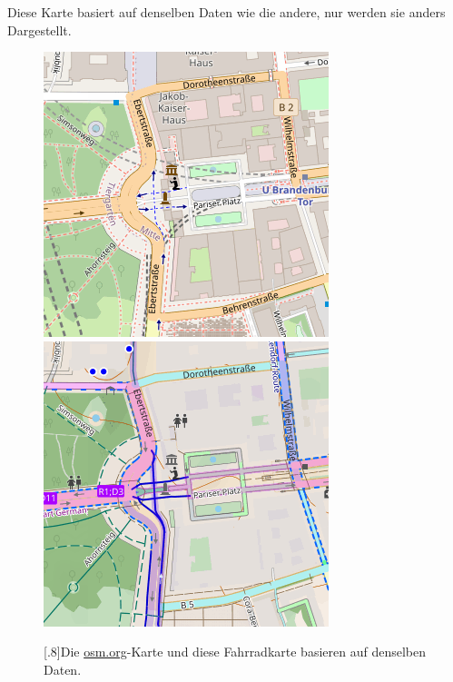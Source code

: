 \documentclass[10pt,foldmark,notumble]{leaflet}
\newcommand{\myhy}[1]{{\color{blue}\setulcolor{blue}\ul{#1}}}
\begin{document}
    Diese Karte basiert auf denselben Daten wie die andere, nur werden sie anders Dargestellt.
    \begin{figure}[H]
        \centering
        \begin{minipage}[b]{0.475\linewidth}
            \includegraphics[width=\linewidth]{carto_bb_s.png}
        \end{minipage}
        \hfill
        \begin{minipage}[b]{0.475\linewidth}
            \includegraphics[width=\linewidth]{cyclosm_bb_s.png}
        \end{minipage}
        \scalebox{.75}[.8]{Die \myhy{osm.org}-Karte und diese Fahrradkarte basieren auf denselben Daten.}
    \end{figure}
\end{document}
